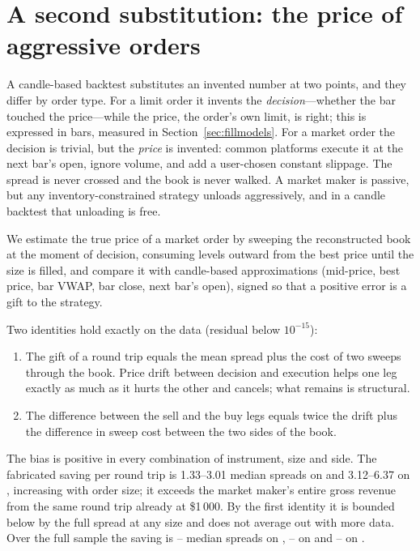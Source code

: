 \section{A second substitution: the price of aggressive orders}
\label{sec:price}

A candle-based backtest substitutes an invented number at two points, and they
differ by order type. For a limit order it invents the \emph{decision}---whether
the bar touched the price---while the price, the order's own limit, is right;
this is \touch{} expressed in bars, measured in Section~\ref{sec:fillmodels}.
For a market order the decision is trivial, but the \emph{price} is invented:
common platforms execute it at the next bar's open, ignore volume, and add a
user-chosen constant slippage. The spread is never crossed and the book is never
walked. A market maker is passive, but any inventory-constrained strategy unloads
aggressively, and in a candle backtest that unloading is free.

We estimate the true price of a market order by sweeping the reconstructed book
at the moment of decision, consuming levels outward from the best price until the
size is filled, and compare it with candle-based approximations (mid-price, best
price, bar VWAP, bar close, next bar's open), signed so that a positive error is
a gift to the strategy.

Two identities hold exactly on the data (residual below $10^{-15}$):
\begin{enumerate}
  \item The gift of a round trip equals the mean spread plus the cost of two
  sweeps through the book. Price drift between decision and execution helps one
  leg exactly as much as it hurts the other and cancels; what remains is
  structural.
  \item The difference between the sell and the buy legs equals twice the drift
  plus the difference in sweep cost between the two sides of the book.
\end{enumerate}
The bias is positive in every combination of instrument, size and side. The
fabricated saving per round trip is 1.33--3.01 median spreads on \SOL{} and
3.12--6.37 on \BTC, increasing with order size; it exceeds the market maker's
entire gross revenue from the same round trip already at \$1\,000. By the first
identity it is bounded below by the full spread at any size and does not average
out with more data. Over the full sample the saving is \tbd--\tbd{} median
spreads on \BTC, \tbd--\tbd{} on \ETH{} and \tbd--\tbd{} on \SOL.
